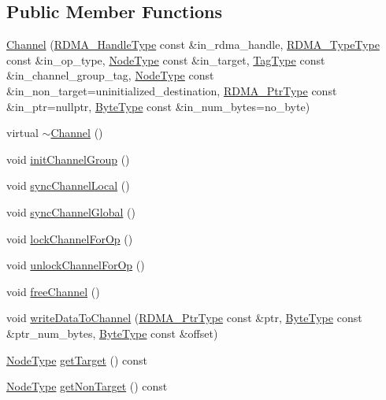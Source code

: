 \subsection*{Public Member Functions}
\begin{DoxyCompactItemize}
\item 
\hyperlink{structvt_1_1rdma_1_1_channel_ae15a5cd0e393f64192675d5a33796523}{Channel} (\hyperlink{namespacevt_a10442579ec4e7ebef223818e64bcf908}{R\+D\+M\+A\+\_\+\+Handle\+Type} const \&in\+\_\+rdma\+\_\+handle, \hyperlink{namespacevt_1_1rdma_ac848e1d9da43db6294bd06f83e5d3946}{R\+D\+M\+A\+\_\+\+Type\+Type} const \&in\+\_\+op\+\_\+type, \hyperlink{namespacevt_a866da9d0efc19c0a1ce79e9e492f47e2}{Node\+Type} const \&in\+\_\+target, \hyperlink{namespacevt_a84ab281dae04a52a4b243d6bf62d0e52}{Tag\+Type} const \&in\+\_\+channel\+\_\+group\+\_\+tag, \hyperlink{namespacevt_a866da9d0efc19c0a1ce79e9e492f47e2}{Node\+Type} const \&in\+\_\+non\+\_\+target=uninitialized\+\_\+destination, \hyperlink{namespacevt_a9e2c953286c7616f7c218e9951790776}{R\+D\+M\+A\+\_\+\+Ptr\+Type} const \&in\+\_\+ptr=nullptr, \hyperlink{namespacevt_aab8d55968084610ce3b17057981e9300}{Byte\+Type} const \&in\+\_\+num\+\_\+bytes=no\+\_\+byte)
\item 
virtual \hyperlink{structvt_1_1rdma_1_1_channel_a4e32f293df8c7d988a080065647c4253}{$\sim$\+Channel} ()
\item 
void \hyperlink{structvt_1_1rdma_1_1_channel_a8b95715326b4f434ebe53c5577403b3b}{init\+Channel\+Group} ()
\item 
void \hyperlink{structvt_1_1rdma_1_1_channel_a5ce567dd26c64a6d8a8ea9a9b3d525f8}{sync\+Channel\+Local} ()
\item 
void \hyperlink{structvt_1_1rdma_1_1_channel_a858e3b9d213cd2fb98e021c5c8b58e96}{sync\+Channel\+Global} ()
\item 
void \hyperlink{structvt_1_1rdma_1_1_channel_ac9dca439a032110524cf303925bace58}{lock\+Channel\+For\+Op} ()
\item 
void \hyperlink{structvt_1_1rdma_1_1_channel_adb5c10cdeb4e72e54433622091b543c6}{unlock\+Channel\+For\+Op} ()
\item 
void \hyperlink{structvt_1_1rdma_1_1_channel_a0e68ef1830979531a430f2a9b0206afb}{free\+Channel} ()
\item 
void \hyperlink{structvt_1_1rdma_1_1_channel_af7d6fb54933f6ad3d12cb600ababfa18}{write\+Data\+To\+Channel} (\hyperlink{namespacevt_a9e2c953286c7616f7c218e9951790776}{R\+D\+M\+A\+\_\+\+Ptr\+Type} const \&ptr, \hyperlink{namespacevt_aab8d55968084610ce3b17057981e9300}{Byte\+Type} const \&ptr\+\_\+num\+\_\+bytes, \hyperlink{namespacevt_aab8d55968084610ce3b17057981e9300}{Byte\+Type} const \&offset)
\item 
\hyperlink{namespacevt_a866da9d0efc19c0a1ce79e9e492f47e2}{Node\+Type} \hyperlink{structvt_1_1rdma_1_1_channel_a2185f0c194fd626b0e617c8e706bf297}{get\+Target} () const
\item 
\hyperlink{namespacevt_a866da9d0efc19c0a1ce79e9e492f47e2}{Node\+Type} \hyperlink{structvt_1_1rdma_1_1_channel_ada79ff7c9444bae5dea0382e277f6b7d}{get\+Non\+Target} () const
\end{DoxyCompactItemize}
